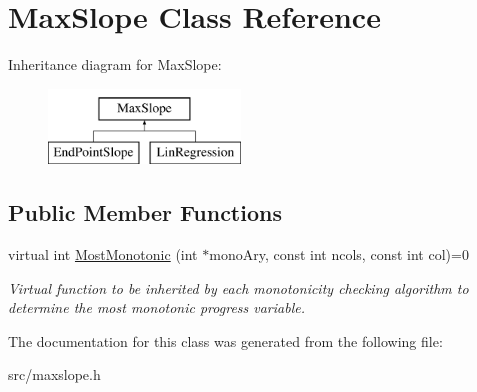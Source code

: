 \hypertarget{classMaxSlope}{
\section{MaxSlope Class Reference}
\label{d0/d39/classMaxSlope}
}
Inheritance diagram for MaxSlope:\begin{figure}[H]
\begin{center}
\leavevmode
\includegraphics[height=2cm]{d0/d39/classMaxSlope}
\end{center}
\end{figure}
\subsection*{Public Member Functions}
\begin{DoxyCompactItemize}
\item 
\hypertarget{classMaxSlope_a494b1b1ae073d3b29fe7cdc023ce7861}{
virtual int \hyperlink{classMaxSlope_a494b1b1ae073d3b29fe7cdc023ce7861}{MostMonotonic} (int $\ast$monoAry, const int ncols, const int col)=0}
\label{d0/d39/classMaxSlope_a494b1b1ae073d3b29fe7cdc023ce7861}

\begin{DoxyCompactList}\small\item\em Virtual function to be inherited by each monotonicity checking algorithm to determine the most monotonic progress variable. \item\end{DoxyCompactList}\end{DoxyCompactItemize}


The documentation for this class was generated from the following file:\begin{DoxyCompactItemize}
\item 
src/maxslope.h\end{DoxyCompactItemize}

